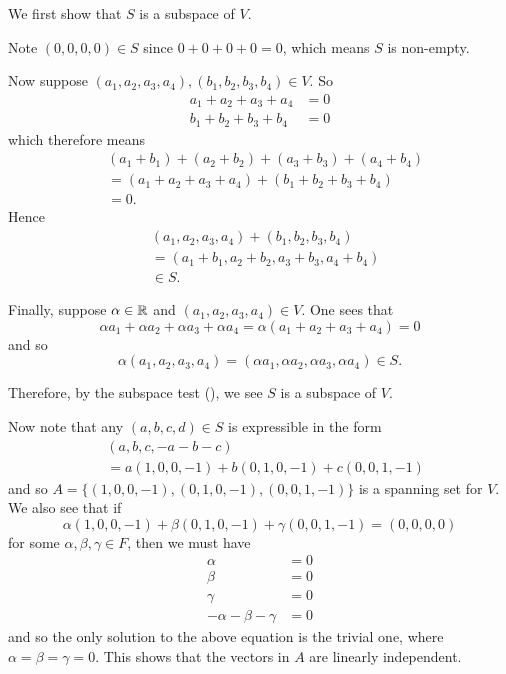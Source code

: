 \begin{questions}
\begin{partquestions}{\alph*}
        \item We first show that $S$ is a subspace of $V$.

        Note $(0, 0, 0, 0) \in S$ since $0 + 0 + 0 + 0 = 0$, which means $S$ is non-empty.

        Now suppose $(a_1, a_2, a_3, a_4), (b_1, b_2, b_3, b_4) \in V$. So
        \begin{align*}
            a_1 + a_2 + a_3 + a_4 &= 0\\
            b_1 + b_2 + b_3 + b_4 &= 0
        \end{align*}
        which therefore means
        \begin{align*}
            &(a_1 + b_1) + (a_2 + b_2) + (a_3 + b_3) + (a_4 + b_4)\\
            &= (a_1 + a_2 + a_3 + a_4) + (b_1 + b_2 + b_3 + b_4)\\
            &= 0.
        \end{align*}
        Hence
        \begin{align*}
            &(a_1, a_2, a_3, a_4) + (b_1, b_2, b_3, b_4)\\
            &= (a_1 + b_1, a_2 + b_2, a_3 + b_3, a_4 + b_4)\\
            &\in S.
        \end{align*}

        Finally, suppose $\alpha \in \mathbb{R}$ and $(a_1, a_2, a_3, a_4) \in V$. One sees that
        \[
            \alpha a_1 + \alpha a_2 + \alpha a_3 + \alpha a_4 = \alpha(a_1 + a_2 + a_3 + a_4) = 0
        \]
        and so
        \[
            \alpha(a_1, a_2, a_3, a_4) = (\alpha a_1, \alpha a_2 , \alpha a_3, \alpha a_4) \in S.
        \]

        Therefore, by the subspace test (), we see $S$ is a subspace of $V$.

        Now note that any $(a, b, c, d) \in S$ is expressible in the form
        \begin{align*}
            &(a, b, c, -a-b-c)\\
            &= a(1, 0, 0, -1) + b(0, 1, 0, -1) + c(0, 0, 1, -1)
        \end{align*}
        and so $A = \{(1, 0, 0, -1), (0, 1, 0, -1), (0, 0, 1, -1)\}$ is a spanning set for $V$. We also see that if
        \[
            \alpha(1, 0, 0, -1) + \beta(0, 1, 0, -1) + \gamma(0, 0, 1, -1) = (0, 0, 0, 0)
        \]
        for some $\alpha, \beta, \gamma \in F$, then we must have
        \begin{align*}
            \alpha &= 0\\
            \beta &= 0\\
            \gamma &= 0\\
            -\alpha - \beta - \gamma &= 0
        \end{align*}
        and so the only solution to the above equation is the trivial one, where $\alpha = \beta = \gamma = 0$. This shows that the vectors in $A$ are linearly independent.


\end{partquestions}
\end{questions}

